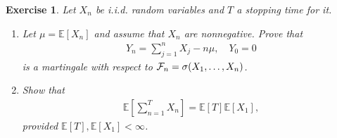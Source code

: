 \documentclass[12pt]{article}
\theoremstyle{colon}
\newtheorem{exercise}{Exercise}
\begin{document}
\clearpage

\begin{exercise}
  Let $X_n$ be i.i.d. random variables and $T$ a stopping time for it.
  \begin{enumerate}[label=\alph*)]
    \item Let $\mu = \mathbb{E}[X_n]$ and assume that $X_n$ are nonnegative. Prove that
      \begin{gather*}
        Y_n = \sum_{j = 1}^n X_j - n \mu, \quad Y_0 = 0
      \end{gather*}
      is a martingale with respect to $\mathcal{F}_n = \sigma(X_1, \mathellipsis, X_n)$.
    \item Show that
      \begin{gather*}
        \mathbb{E} \left[ \sum_{n = 1}^T X_n \right] = \mathbb{E}[T] \mathbb{E}[X_1],
      \end{gather*}
      provided $\mathbb{E}[T], \mathbb{E}[X_1] < \infty$.
  \end{enumerate}
\end{exercise}
\end{document}
